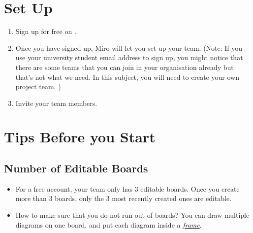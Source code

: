 \documentclass[letterpaper,10pt,english]{jupyterBook}
\begin{document}
\section{Set Up}
\label{\detokenize{appendices/appendix_d/miro_guide:set-up}}\begin{enumerate}
%
\item {} 
\sphinxAtStartPar
Sign up for free on .

\item {} 
\sphinxAtStartPar
Once you have signed up, Miro will let you set up your team. (Note: If you use your university student
email address to sign up, you might notice that there are some teams that you can join in your organisation
already \sphinxhyphen{} but that’s not what we need. In this subject, you will need to create your own project team. )

\item {} 
\sphinxAtStartPar
Invite your team members.

\end{enumerate}


\section{Tips Before you Start}
\label{\detokenize{appendices/appendix_d/miro_guide:tips-before-you-start}}

\subsection{Number of Editable Boards}
\label{\detokenize{appendices/appendix_d/miro_guide:number-of-editable-boards}}\begin{itemize}
\item {} 
\sphinxAtStartPar
For a free account, your team only has 3 editable boards. Once you create more than 3 boards, only the 3 most
recently created ones are editable.

\item {} 
\sphinxAtStartPar
How to make sure that you do not run out of boards? You can draw multiple diagrams on one board, and put each
diagram inside a {\hyperref[\detokenize{appendices/appendix_d/miro_guide:frame}]{\emph{frame}}}.

\end{itemize}
\end{document}
